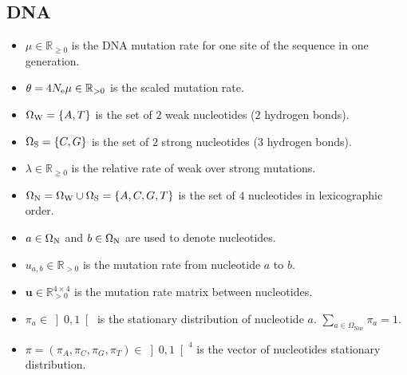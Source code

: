 \subsection{DNA}
\begin{itemize}
	\item $\mu \in \mathbb{R}_{\geq 0}$ is the \acrshort{DNA} mutation rate for one site of the sequence in one generation.
	\item $\theta=4 N_{\textrm{e}} \mu \in \mathbb{R}_{>0} $ is the scaled mutation rate.
	\item $ \Omega_{\mathrm{W}} = \left\{ A,T \right\} $ is the set of $2$ weak nucleotides ($2$ hydrogen bonds).
	\item $ \Omega_{\mathrm{S}} = \left\{C,G \right\} $ is the set of $2$ strong nucleotides ($3$ hydrogen bonds).
	\item $\lambda \in \mathbb{R}_{\geq 0} $ is the relative rate of weak over strong mutations.
	\item $ \Omega_{\mathrm{N}} = \Omega_{\mathrm{W}} \cup \Omega_{\mathrm{S}} =\left\{ A,C,G,T \right\} $ is the set of $4$ nucleotides in lexicographic order.
	\item $a \in \Omega_{\mathrm{N}} $ and $b \in \Omega_{\mathrm{N}} $ are used to denote nucleotides.
	\item $u_{a,b} \in \mathbb{R}_{> 0}$ is the mutation rate from nucleotide $a$ to $b$.
	\item $\bm{u} \in \mathbb{R}_{> 0}^{4 \times 4} $ is the mutation rate matrix between nucleotides.
	\item $\pi_a \in \left]0,1\right[ $ is the stationary distribution of nucleotide $a$. $\sum_{a \in \Omega_{\mathrm{Nuc}}} \pi_a = 1$.
	\item $\pi = \left(\pi_A , \pi_C , \pi_G , \pi_T \right) \in \left]0,1\right[^4$ is the vector of nucleotides stationary distribution.
\end{itemize}

